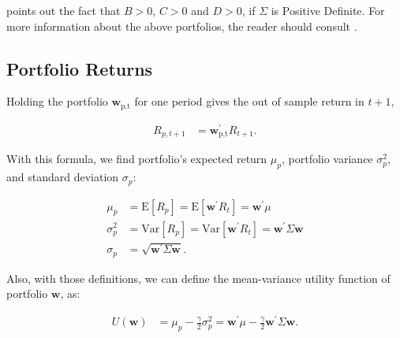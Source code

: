 \documentclass[12pt,oneside,a4paper]{memoir}
\begin{document}
\noindent
\cite[p. 1853]{merton1972} points out the fact that $B>0$, $C>0$ and $D>0$, if $\Sigma$ is Positive Definite.
For more information about the above portfolios, the reader should consult .

\subsection*{Portfolio Returns}

Holding the portfolio $\mathbf{w}_{\textrm{p,t}}$ for one period gives the out of sample return in $t+1$,

\vspace{-18 pt}
\begin{align} \label{retport:oos}
	R_{p,t+1} &= \mathbf{w}_{\textrm{p,t}}^{\prime}  R_{t+1}.
\end{align}

\noindent
With this formula, we find portfolio's expected return $\mu_{p}$, portfolio variance $\sigma^{2}_{p}$, and standard deviation $\sigma_{p}$:

\vspace{-18 pt}
\begin{align*}
	\label{muport}
	\mu_p &= \mathrm{E}[R_p] = \mathrm{E}[ \mathbf{w}^{\prime}R_{t} ] = \mathbf{w}^{\prime}\mu 
	\\
	\label{varport}
	\sigma_p^2 &= \mathrm{Var}[R_p] = \mathrm{Var}[\mathbf{w}^{\prime} R_{t}] = \mathbf{w}^{\prime}\Sigma \mathbf{w} 
	\\
	\label{sdport}
	\sigma_p &=  \sqrt{\mathbf{w}^{\prime}\Sigma \mathbf{w}}.
\end{align*}

\noindent
Also, with those definitions, we can define the mean-variance utility function of portfolio $\mathbf{w}$, as:

\vspace{-18 pt}
\begin{align}\label{port:util}
U(\mathbf{w}) &=
\mu_{p} - \frac{\gamma}{2} \sigma^2_{p} =
\mathbf{w}^{\prime} \mu - \frac{\gamma}{2} \mathbf{w}^{\prime} \Sigma \mathbf{w}.
\end{align}

\end{document}
